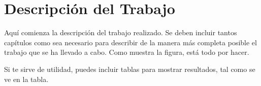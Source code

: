 \chapter{Descripción del Trabajo}
\label{cap:descripcionTrabajo}


Aquí comienza la descripción del trabajo realizado. Se deben incluir tantos capítulos como sea necesario para describir de la manera más completa posible el trabajo que se ha llevado a cabo. Como muestra la figura, está todo por hacer.

Si te sirve de utilidad,  puedes incluir tablas para mostrar resultados, tal como se ve en la tabla.


